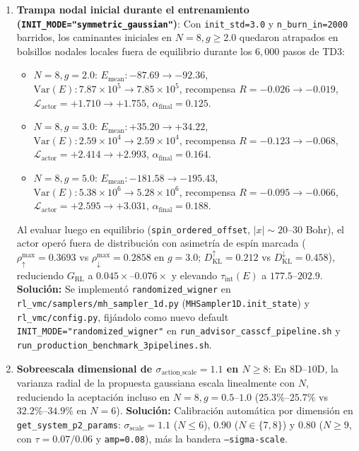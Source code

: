 \documentclass[10pt,a4paper]{article}
\begin{document}
\begin{enumerate}
\item \textbf{Trampa nodal inicial durante el entrenamiento (\texttt{INIT\_MODE="symmetric\_gaussian"})}: Con \texttt{init\_std=3.0} y \texttt{n\_burn\_in=2000} barridos, los caminantes iniciales en $N=8, g \ge 2.0$ quedaron atrapados en bolsillos nodales locales fuera de equilibrio durante los $6{,}000$ pasos de TD3:
\begin{itemize}
\item $N=8, g=2.0$: $E_{\mathrm{mean}}: -87.69 \to -92.36$, $\mathrm{Var}(E): 7.87\times 10^5 \to 7.85\times 10^5$, recompensa $R = -0.026 \to -0.019$, $\mathcal{L}_{\mathrm{actor}} = +1.710 \to +1.755$, $\alpha_{\mathrm{final}}=0.125$.
\item $N=8, g=3.0$: $E_{\mathrm{mean}}: +35.20 \to +34.22$, $\mathrm{Var}(E): 2.59\times 10^4 \to 2.59\times 10^4$, recompensa $R = -0.123 \to -0.068$, $\mathcal{L}_{\mathrm{actor}} = +2.414 \to +2.993$, $\alpha_{\mathrm{final}}=0.164$.
\item $N=8, g=5.0$: $E_{\mathrm{mean}}: -181.58 \to -195.43$, $\mathrm{Var}(E): 5.38\times 10^6 \to 5.28\times 10^6$, recompensa $R = -0.095 \to -0.066$, $\mathcal{L}_{\mathrm{actor}} = +2.595 \to +3.031$, $\alpha_{\mathrm{final}}=0.188$.
\end{itemize}
Al evaluar luego en equilibrio (\texttt{spin\_ordered\_offset}, $|x| \sim 20\text{–}30$ Bohr), el actor operó fuera de distribución con asimetría de espín marcada ($\rho_\uparrow^{\max}=0.3693$ vs $\rho_\downarrow^{\max}=0.2858$ en $g=3.0$; $D_{\mathrm{KL}}^{\uparrow}=0.212$ vs $D_{\mathrm{KL}}^{\downarrow}=0.458$), reduciendo $G_{\mathrm{RL}}$ a $0.045\times\text{–}0.076\times$ y elevando $\tau_{\mathrm{int}}(E)$ a $177.5\text{–}202.9$. \textbf{Solución:} Se implementó \texttt{randomized\_wigner} en \texttt{rl\_vmc/samplers/mh\_sampler\_1d.py} (\texttt{MHSampler1D.init\_state}) y \texttt{rl\_vmc/config.py}, fijándolo como nuevo default \texttt{INIT\_MODE="randomized\_wigner"} en \texttt{run\_advisor\_casscf\_pipeline.sh} y \texttt{run\_production\_benchmark\_3pipelines.sh}.

\item \textbf{Sobreescala dimensional de $\sigma_{\mathrm{action\_scale}} = 1.1$ en $N \ge 8$}: En $8\mathrm{D}\text{–}10\mathrm{D}$, la varianza radial de la propuesta gaussiana escala linealmente con $N$, reduciendo la aceptación incluso en $N=8, g=0.5\text{–}1.0$ ($25.3\%\text{–}25.7\%$ vs $32.2\%\text{–}34.9\%$ en $N=6$). \textbf{Solución:} Calibración automática por dimensión en \texttt{get\_system\_p2\_params}: $\sigma_{\mathrm{scale}}=1.1$ ($N \le 6$), $0.90$ ($N \in \{7,8\}$) y $0.80$ ($N \ge 9$, con $\tau=0.07/0.06$ y \texttt{amp=0.08}), más la bandera \texttt{--sigma-scale}.


\end{enumerate}
\end{document}

